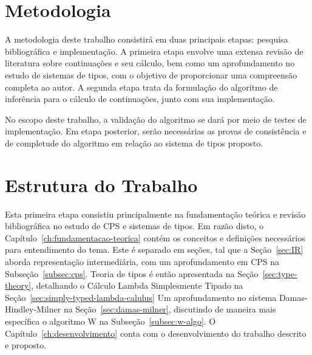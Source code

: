 \section{Metodologia}\label{sec:metodologia}

A metodologia deste trabalho consistirá em duas principais etapas: pesquisa bibliográfica e implementação.
A primeira etapa envolve uma extensa revisão de literatura sobre continuações e seu cálculo, bem como um aprofundamento no estudo de sistemas de tipos, com o objetivo de proporcionar uma compreensão completa ao autor.
A segunda etapa trata da formulação do algoritmo de inferência para o cálculo de continuações, junto com sua implementação.

No escopo deste trabalho, a validação do algoritmo se dará por meio de testes de implementação.
Em etapa posterior, serão necessárias as provas de consistência e de completude do algoritmo em relação ao sistema de tipos proposto.

\section{Estrutura do Trabalho}\label{sec:estrutura-trabalho}

Esta primeira etapa consistiu principalmente na fundamentação teórica e revisão bibliográfica no estudo de CPS e sistemas de tipos.
Em razão disto, o Capítulo~\ref{ch:fundamentacao-teorica} contém os conceitos e definições necessários para entendimento do tema.
Este é separado em seções, tal que a Seção~\ref{sec:IR} aborda representação intermediária, com um aprofundamento em CPS na Subseção~\ref{subsec:cps}.
Teoria de tipos é então apresentada na Seção~\ref{sec:type-theory}, detalhando o Cálculo Lambda Simplesmente Tipado na Seção~\ref{sec:simply-typed-lambda-calulus}
Um aprofundamento no sistema Damas-Hindley-Milner na Seção~\ref{sec:damas-milner}, discutindo de maneira mais específica o algoritmo W na Subseção~\ref{subsec:w-algo}.
O Capítulo~\ref{ch:desenvolvimento} conta com o desenvolvimento do trabalho descrito e proposto.
